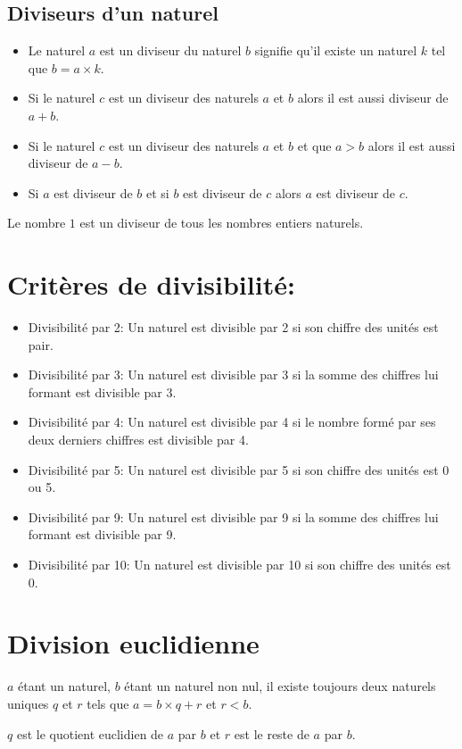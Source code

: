 \documentclass[11pt,a4paper,x11names,usenames,dvipsnames,svgnames,oneside]{ctexbook}
\def\skn{\tcbsubskin{skn}{empty}{frame code={%
}}}
\newenvironment{rem}{\skn\boxxr\tcbtitle}{\endboxxr}
\def\skn{\tcbsubskin{skn}{empty}{frame code={%
}}}
\begin{document}
	\subsection{ Diviseurs d'un naturel }
	\begin{df}%
		\begin{itemize}
			\item Le naturel $a$ est un diviseur du naturel $b$ signifie qu'il existe un naturel $k$ tel que $b=a\times k$.
			\item Si le naturel $c$ est un diviseur des naturels $a$ et $b$ alors il est aussi diviseur de $a+b$. 
			\item Si le naturel $c$ est un diviseur des naturels $a$ et $b$ et que $a>b$ alors il est aussi diviseur de $a-b$. 
			\item Si $a$ est diviseur de $b$ et si $b$ est diviseur de $c$ alors $a$ est diviseur de $c$. 
		\end{itemize}
	\end{df}
	\begin{rem}%
		Le nombre $1$ est un diviseur de tous les nombres entiers naturels.
	\end{rem}
	\section{ Critères de divisibilité:}
	\begin{pr}%
		\begin{itemize}
			\item  Divisibilité par 2: Un naturel est divisible par 2 si son chiffre des unités est pair. 
			\item Divisibilité par 3: Un  naturel est divisible par 3 si la somme des chiffres lui formant est divisible par 3.    
			\item Divisibilité par 4: Un naturel est divisible par 4 si le nombre formé par ses deux derniers chiffres est divisible par 4. 
			\item Divisibilité par 5: Un  naturel est divisible par 5 si son chiffre des unités est 0 ou 5.  
			\item Divisibilité par 9: Un  naturel est divisible par 9 si la somme des chiffres lui formant est divisible par 9.   
			\item Divisibilité par 10: Un  naturel est divisible par 10 si son chiffre des unités est 0. 
		\end{itemize}
	\end{pr}
	\section{ Division euclidienne}
	\begin{df}%
		$a$ étant un naturel, $b$ étant un naturel non nul, il existe toujours deux naturels uniques $q$ et $r$ tels que $a = b\times q + r $ et $ r < b$. 
		
		$q$ est le quotient euclidien de $a$ par $b$ et  $r$ est le reste de $a$ par $b$. 
	\end{df}
\end{document}
